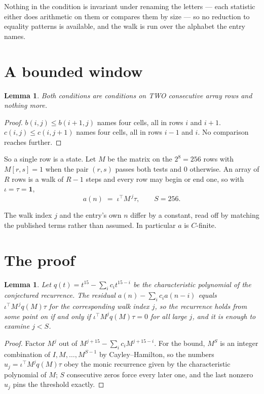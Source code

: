 \documentclass[11pt,a4paper]{article}
\theoremstyle{plain}
\newtheorem{lemma}[theorem]{Lemma}
\theoremstyle{definition}
\begin{document}
Nothing in the condition is invariant under renaming the letters --- each statistic either does
arithmetic on them or compares them by size --- so no reduction to equality patterns is
available, and the walk is run over the alphabet the entry names.

\section{A bounded window}

\begin{lemma}\label{lem:win}
Both conditions are conditions on TWO consecutive array rows and nothing more.
\end{lemma}

\begin{proof}
$b(i,j)\le b(i{+}1,j)$ names four cells, all in rows $i$ and $i+1$. $c(i,j)\le c(i,j{+}1)$
names four cells, all in rows $i-1$ and $i$. No comparison reaches further.
\end{proof}

So a single row is a state. Let $M$ be the matrix on the $2^{8}=256$ rows with
$M[r,s]=1$ when the pair $(r,s)$ passes both tests and $0$ otherwise. An array of $R$ rows is a
walk of $R-1$ steps and every row may begin or end one, so with $\iota=\tau=\mathbf{1}$,
\[
a(n)\;=\;\iota^{\!\top}M^{\,j}\tau ,\qquad S=256.
\]

The walk index $j$ and the entry's own $n$ differ by a constant, read off by matching the
published terms rather than assumed. In particular $a$ is $C$-finite.

\section{The proof}

\begin{lemma}\label{lem:crit}
Let $q(t)=t^{15}-\sum_i c_it^{15-i}$ be the characteristic polynomial of the
conjectured recurrence. The residual $a(n)-\sum_ic_ia(n-i)$ equals
$\iota^{\!\top}M^{\,j}q(M)\tau$ for the corresponding walk index $j$, so the recurrence
holds from some point on if and only if $\iota^{\!\top}M^{j}q(M)\tau=0$ for all large $j$,
and it is enough to examine $j<S$.
\end{lemma}

\begin{proof}
Factor $M^{j}$ out of $M^{j+15}-\sum_ic_iM^{j+15-i}$. For the bound, $M^{S}$
is an integer combination of $I,M,\dots,M^{S-1}$ by Cayley--Hamilton, so the numbers
$u_j=\iota^{\!\top}M^{j}q(M)\tau$ obey the monic recurrence given by the characteristic
polynomial of $M$; $S$ consecutive zeros force every later one, and the last nonzero $u_j$
pins the threshold exactly.
\end{proof}
\end{document}

